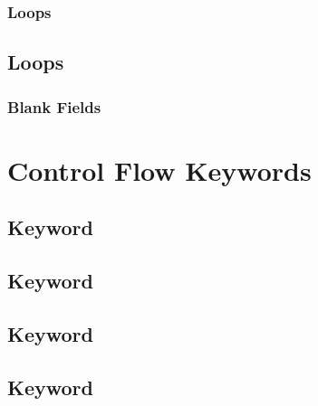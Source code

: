 \documentclass{article}
\begin{document}
\subsubsection{ Loops}

\subsection{ Loops}

\subsubsection{Blank Fields}

\section{Control Flow Keywords}

\subsection{ Keyword}

\subsection{ Keyword}

\subsection{ Keyword}

\subsection{ Keyword}
\end{document}
